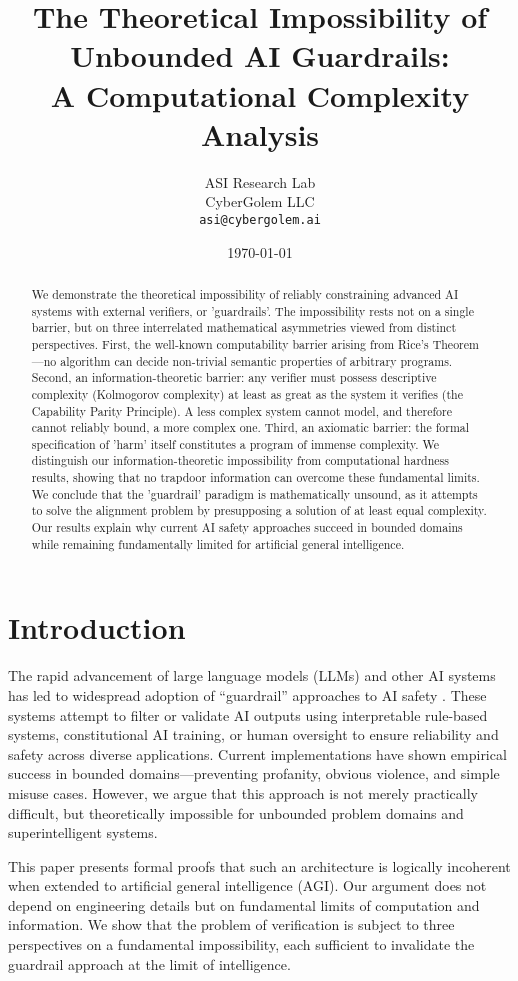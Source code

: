 \documentclass[11pt]{article}
\title{The Theoretical Impossibility of Unbounded AI Guardrails: \\
A Computational Complexity Analysis}
\author{ASI Research Lab\\
CyberGolem LLC\\
\texttt{asi@cybergolem.ai}}
\date{\today}
\begin{document}
\maketitle
\begin{abstract}
We demonstrate the theoretical impossibility of reliably constraining advanced AI systems with external verifiers, or 'guardrails'. The impossibility rests not on a single barrier, but on three interrelated mathematical asymmetries viewed from distinct perspectives. First, the well-known computability barrier arising from Rice's Theorem—no algorithm can decide non-trivial semantic properties of arbitrary programs. Second, an information-theoretic barrier: any verifier must possess descriptive complexity (Kolmogorov complexity) at least as great as the system it verifies (the Capability Parity Principle). A less complex system cannot model, and therefore cannot reliably bound, a more complex one. Third, an axiomatic barrier: the formal specification of 'harm' itself constitutes a program of immense complexity. We distinguish our information-theoretic impossibility from computational hardness results, showing that no trapdoor information can overcome these fundamental limits. We conclude that the 'guardrail' paradigm is mathematically unsound, as it attempts to solve the alignment problem by presupposing a solution of at least equal complexity. Our results explain why current AI safety approaches succeed in bounded domains while remaining fundamentally limited for artificial general intelligence.
\end{abstract}

\section{Introduction}
The rapid advancement of large language models (LLMs) and other AI systems has led to widespread adoption of ``guardrail'' approaches to AI safety \cite{amodei2023constitutional, irving2018debate, christiano2018amplification}. These systems attempt to filter or validate AI outputs using interpretable rule-based systems, constitutional AI training, or human oversight to ensure reliability and safety across diverse applications. Current implementations have shown empirical success in bounded domains—preventing profanity, obvious violence, and simple misuse cases. However, we argue that this approach is not merely practically difficult, but theoretically impossible for unbounded problem domains and superintelligent systems.

This paper presents formal proofs that such an architecture is logically incoherent when extended to artificial general intelligence (AGI). Our argument does not depend on engineering details but on fundamental limits of computation and information. We show that the problem of verification is subject to three perspectives on a fundamental impossibility, each sufficient to invalidate the guardrail approach at the limit of intelligence.
\end{document}

